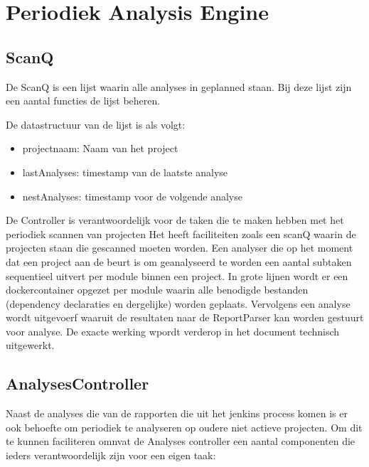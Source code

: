 \section{Periodiek Analysis Engine}

\subsection{ScanQ}
De ScanQ is een lijst waarin alle analyses in geplanned staan. Bij deze lijst zijn een aantal functies de lijst beheren.

De datastructuur van de lijst is als volgt:
\begin{itemize}
    \item projectnaam: Naam van het project
    \item lastAnalyses: timestamp van de laatste analyse
    \item nestAnalyses: timestamp voor de volgende analyse
\end{itemize}
De Controller is verantwoordelijk voor de taken die te maken hebben met het periodiek scannen van projecten Het heeft faciliteiten zoals een scanQ waarin de projecten staan die gescanned moeten worden. Een analyser die op het moment dat een project aan de beurt is om geanalyseerd te worden een aantal subtaken sequentieel uitvert per module binnen een project.
In grote lijnen wordt er een dockercontainer opgezet per module waarin alle benodigde bestanden (dependency declaraties en dergelijke) worden geplaats. Vervolgens een analyse wordt uitgevoerf waaruit de resultaten naar de ReportParser kan worden gestuurt voor analyse. De exacte werking wpordt verderop in het document technisch uitgewerkt.



\subsection{AnalysesController}\label{subsec:controller}
Naast de analyses die van de rapporten die uit het jenkins process komen is er ook behoefte om periodiek te analyseren op oudere niet actieve projecten. Om dit te kunnen faciliteren omnvat de Analyses controller een aantal componenten die ieders verantwoordelijk zijn voor een eigen taak:

